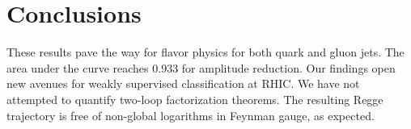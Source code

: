 \section{Conclusions}\label{sec:conclusions}

These results pave the way for flavor physics for both quark and gluon
jets. The area under the curve reaches 0.933 for amplitude reduction.
Our findings open new avenues for weakly supervised classification at
RHIC. We have not attempted to quantify two-loop factorization theorems.
The resulting Regge trajectory is free of non-global logarithms in
Feynman gauge, as expected.

